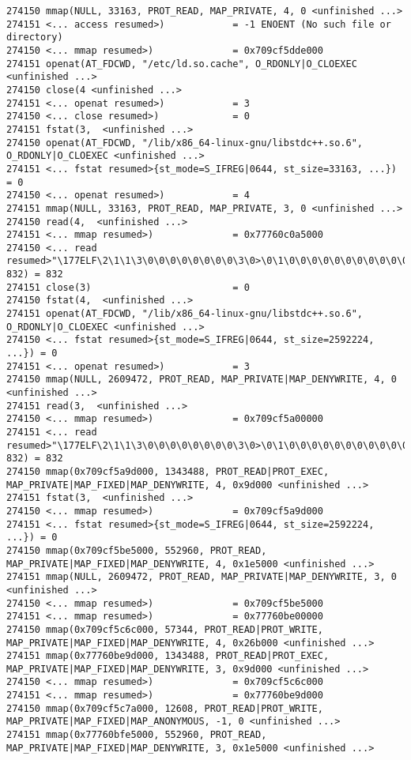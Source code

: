\begin{verbatim}
274150 mmap(NULL, 33163, PROT_READ, MAP_PRIVATE, 4, 0 <unfinished ...>
274151 <... access resumed>)            = -1 ENOENT (No such file or directory)
274150 <... mmap resumed>)              = 0x709cf5dde000
274151 openat(AT_FDCWD, "/etc/ld.so.cache", O_RDONLY|O_CLOEXEC <unfinished ...>
274150 close(4 <unfinished ...>
274151 <... openat resumed>)            = 3
274150 <... close resumed>)             = 0
274151 fstat(3,  <unfinished ...>
274150 openat(AT_FDCWD, "/lib/x86_64-linux-gnu/libstdc++.so.6", O_RDONLY|O_CLOEXEC <unfinished ...>
274151 <... fstat resumed>{st_mode=S_IFREG|0644, st_size=33163, ...}) = 0
274150 <... openat resumed>)            = 4
274151 mmap(NULL, 33163, PROT_READ, MAP_PRIVATE, 3, 0 <unfinished ...>
274150 read(4,  <unfinished ...>
274151 <... mmap resumed>)              = 0x77760c0a5000
274150 <... read resumed>"\177ELF\2\1\1\3\0\0\0\0\0\0\0\0\3\0>\0\1\0\0\0\0\0\0\0\0\0\0\0"..., 832) = 832
274151 close(3)                         = 0
274150 fstat(4,  <unfinished ...>
274151 openat(AT_FDCWD, "/lib/x86_64-linux-gnu/libstdc++.so.6", O_RDONLY|O_CLOEXEC <unfinished ...>
274150 <... fstat resumed>{st_mode=S_IFREG|0644, st_size=2592224, ...}) = 0
274151 <... openat resumed>)            = 3
274150 mmap(NULL, 2609472, PROT_READ, MAP_PRIVATE|MAP_DENYWRITE, 4, 0 <unfinished ...>
274151 read(3,  <unfinished ...>
274150 <... mmap resumed>)              = 0x709cf5a00000
274151 <... read resumed>"\177ELF\2\1\1\3\0\0\0\0\0\0\0\0\3\0>\0\1\0\0\0\0\0\0\0\0\0\0\0"..., 832) = 832
274150 mmap(0x709cf5a9d000, 1343488, PROT_READ|PROT_EXEC, MAP_PRIVATE|MAP_FIXED|MAP_DENYWRITE, 4, 0x9d000 <unfinished ...>
274151 fstat(3,  <unfinished ...>
274150 <... mmap resumed>)              = 0x709cf5a9d000
274151 <... fstat resumed>{st_mode=S_IFREG|0644, st_size=2592224, ...}) = 0
274150 mmap(0x709cf5be5000, 552960, PROT_READ, MAP_PRIVATE|MAP_FIXED|MAP_DENYWRITE, 4, 0x1e5000 <unfinished ...>
274151 mmap(NULL, 2609472, PROT_READ, MAP_PRIVATE|MAP_DENYWRITE, 3, 0 <unfinished ...>
274150 <... mmap resumed>)              = 0x709cf5be5000
274151 <... mmap resumed>)              = 0x77760be00000
274150 mmap(0x709cf5c6c000, 57344, PROT_READ|PROT_WRITE, MAP_PRIVATE|MAP_FIXED|MAP_DENYWRITE, 4, 0x26b000 <unfinished ...>
274151 mmap(0x77760be9d000, 1343488, PROT_READ|PROT_EXEC, MAP_PRIVATE|MAP_FIXED|MAP_DENYWRITE, 3, 0x9d000 <unfinished ...>
274150 <... mmap resumed>)              = 0x709cf5c6c000
274151 <... mmap resumed>)              = 0x77760be9d000
274150 mmap(0x709cf5c7a000, 12608, PROT_READ|PROT_WRITE, MAP_PRIVATE|MAP_FIXED|MAP_ANONYMOUS, -1, 0 <unfinished ...>
274151 mmap(0x77760bfe5000, 552960, PROT_READ, MAP_PRIVATE|MAP_FIXED|MAP_DENYWRITE, 3, 0x1e5000 <unfinished ...>

\end{verbatim}
